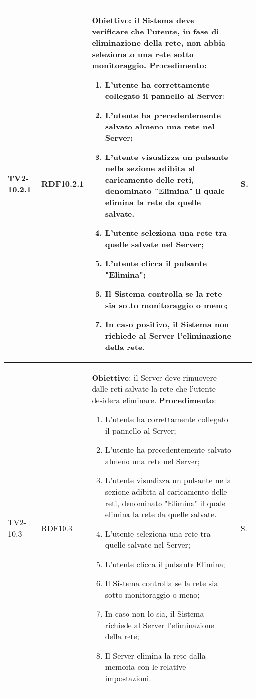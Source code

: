 \begin{longtable}{|C{.15\textwidth}|C{.13\textwidth}|m{.65\textwidth}|C{.08\textwidth}|}
TV2-10.2.1 & RDF10.2.1 &
	\textbf{Obiettivo}: il Sistema deve verificare che l'utente, in fase di eliminazione della rete, non abbia selezionato una rete sotto monitoraggio. \newline
	\textbf{Procedimento}:
	\begin{enumerate}
		\item L'utente ha correttamente collegato il pannello al Server;
		\item L'utente ha precedentemente salvato almeno una rete nel Server;
		\item L'utente visualizza un pulsante nella sezione adibita al caricamento delle reti, denominato "Elimina" il quale elimina la rete da quelle salvate.
		\item L'utente seleziona una rete tra quelle salvate nel Server;
		\item L'utente clicca il pulsante "Elimina";
		\item Il Sistema controlla se la rete sia sotto monitoraggio o meno;
		\item In caso positivo, il Sistema non richiede al Server l'eliminazione della rete.
	\end{enumerate}
	& S. \\
\hline

TV2-10.3 & RDF10.3 &
	\textbf{Obiettivo}: il Server deve rimuovere dalle reti salvate la rete che l'utente desidera eliminare. \newline
	\textbf{Procedimento}:
	\begin{enumerate}
		\item L'utente ha correttamente collegato il pannello al Server;
		\item L'utente ha precedentemente salvato almeno una rete nel Server;
		\item L'utente visualizza un pulsante nella sezione adibita al caricamento delle reti, denominato "Elimina" il quale elimina la rete da quelle salvate.
		\item L'utente seleziona una rete tra quelle salvate nel Server;
		\item L'utente clicca il pulsante Elimina;
		\item Il Sistema controlla se la rete sia sotto monitoraggio o meno;
		\item In caso non lo sia, il Sistema richiede al Server l'eliminazione della rete;
		\item Il Server elimina la rete dalla memoria con le relative impostazioni.
	\end{enumerate}
	& S. \\
\hline


\end{longtable}
